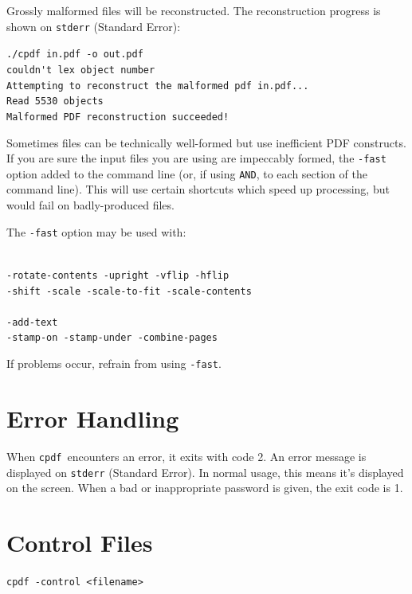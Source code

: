 \documentclass[a4paper,makeidx]{memoir}
\newcommand{\cpdf}{\texttt{cpdf}}
\begin{document}
Grossly malformed files will be reconstructed. The reconstruction
progress is shown on \verb!stderr! (Standard Error):

\begin{framed}
\noindent\small\verb!./cpdf in.pdf -o out.pdf!\\
\small\verb!couldn't lex object number!\\
\small\verb!Attempting to reconstruct the malformed pdf in.pdf...!\\
\small\verb!Read 5530 objects!\\
\small\verb$Malformed PDF reconstruction succeeded!$
\end{framed}

\noindent Sometimes files can be technically well-formed but use inefficient PDF
constructs.  If you are sure the input files you are using are
impeccably formed, the \texttt{-fast} option added to the command line (or, if
using \texttt{AND}, to each section of the command line). This will use certain
shortcuts which speed up processing, but would fail on badly-produced files.

The \verb!-fast! option may be used with:

\begin{framed}
\small\noindent {}\\
\noindent\small\verb!-rotate-contents -upright -vflip -hflip!\\
\small\verb!-shift -scale -scale-to-fit -scale-contents!\\

\noindent {}\\
\noindent\small\verb!-add-text!\\
\small\verb!-stamp-on -stamp-under -combine-pages!
\end{framed}

\noindent If problems occur, refrain from using \verb!-fast!.

\section{Error Handling}
When \cpdf\ encounters an error, it exits with code 2. An error message is
displayed on \texttt{stderr} (Standard Error). In normal usage, this means it's
displayed on the screen. When a bad or inappropriate password is given, the exit code is 1.

\section{Control Files}
\begin{framed}
  \noindent\small\verb!cpdf -control <filename>!
\end{framed}
\end{document}

